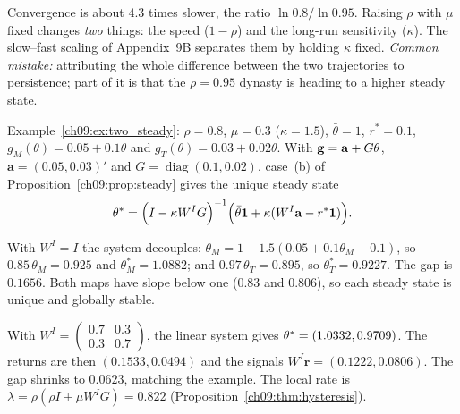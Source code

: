 \documentclass[../solutions_manual.tex]{subfiles}
\begin{document}
Convergence is about $4.3$ times slower, the ratio $\ln 0.8/\ln 0.95$. Raising $\rho$ with $\mu$ fixed changes \emph{two} things: the speed ($1 - \rho$) and the long-run sensitivity ($\kappa$). The slow--fast scaling of Appendix~9B separates them by holding $\kappa$ fixed. \emph{Common mistake:} attributing the whole difference between the two trajectories to persistence; part of it is that the $\rho = 0.95$ dynasty is heading to a higher steady state.


Example~\ref{ch09:ex:two_steady}: $\rho = 0.8$, $\mu = 0.3$ ($\kappa = 1.5$), $\bar\theta = 1$, $r^* = 0.1$, $g_M(\theta) = 0.05 + 0.1\theta$ and $g_T(\theta) = 0.03 + 0.02\theta$. With $\mathbf g = \mathbf a + G\theta$, $\mathbf a = (0.05, 0.03)'$ and $G = \operatorname{diag}(0.1, 0.02)$, case~(b) of Proposition~\ref{ch09:prop:steady} gives the unique steady state
\[
\theta^* = \Bigl(I - \kappa W^IG\Bigr)^{-1}\Bigl(\bar\theta\mathbf{1} + \kappa(W^I\mathbf a - r^*\mathbf{1})\Bigr).
\]

 With $W^I = I$ the system decouples: $\theta_M = 1 + 1.5(0.05 + 0.1\theta_M - 0.1)$, so $0.85\,\theta_M = 0.925$ and $\theta_M^* = 1.0882$; and $0.97\,\theta_T = 0.895$, so $\theta_T^* = 0.9227$. The gap is $0.1656$. Both maps have slope below one ($0.83$ and $0.806$), so each steady state is unique and globally stable.

 With $W^I = \begin{pmatrix}0.7 & 0.3\\0.3 & 0.7\end{pmatrix}$, the linear system gives $\theta^* = (1.0332, 0.9709)$. The returns are then $(0.1533, 0.0494)$ and the signals $W^I\mathbf r = (0.1222, 0.0806)$. The gap shrinks to $0.0623$, matching the example. The local rate is $\lambda = \rho(\rho I + \mu W^IG) = 0.822$ (Proposition~\ref{ch09:thm:hysteresis}).
\end{document}
